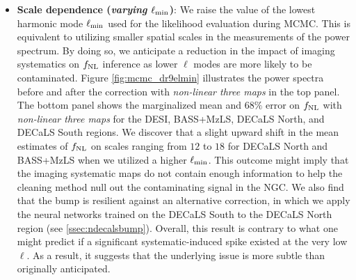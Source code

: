 \begin{itemize}[itemindent=*]
\item \textbf{Scale dependence (\textit{varying $\ell_{\rm min}$})}: We raise the value of the lowest harmonic mode $\ell_{\rm min}$ used for the likelihood evaluation during MCMC. This is equivalent to utilizing smaller spatial scales in the measurements of the power spectrum. By doing so, we anticipate a reduction in the impact of imaging systematics on $f_{\rm NL}$ inference as lower $\ell$ modes are more likely to be contaminated. Figure \ref{fig:mcmc_dr9elmin} illustrates the power spectra before and after the correction with \textit{non-linear three maps} in the top panel. The bottom panel shows the marginalized mean and $68\%$ error on $f_{\rm NL}$ with \textit{non-linear three maps} for the DESI, BASS+MzLS, DECaLS North, and DECaLS South regions. We discover that a slight upward shift in the mean estimates of $f_{\rm NL}$ on scales ranging from $12$ to $18$ for DECaLS North and BASS+MzLS when we utilized a higher $\ell_{\rm min}$. This outcome might imply that the imaging systematic maps do not contain enough information to help the cleaning method null out the contaminating signal in the NGC. We also find that the bump is resilient against an alternative correction, in which we apply the neural networks trained on the DECaLS South to the DECaLS North region (see \ref{ssec:ndecalsbump}). Overall, this result is contrary to what one might predict if a significant systematic-induced spike existed at the very low $\ell$. As a result, it suggests that the underlying issue is more subtle than originally anticipated.

\end{itemize}



